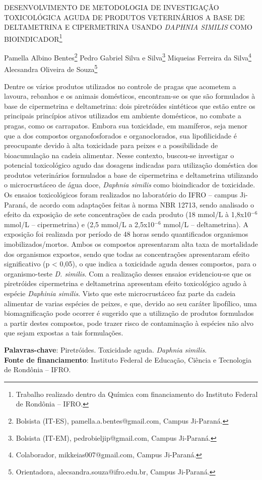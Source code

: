 \documentclass[article,12pt,onesidea,4paper,english,brazil]{abntex2}
\begin{document}
	
	
	\frenchspacing 
	
	\begin{center}
		\LARGE DESENVOLVIMENTO DE METODOLOGIA DE INVESTIGAÇÃO TOXICOLÓGICA AGUDA DE PRODUTOS VETERINÁRIOS A BASE DE DELTAMETRINA E CIPERMETRINA USANDO \textit{DAPHNIA SIMILIS} COMO BIOINDICADOR\footnote{Trabalho realizado dentro da Química com financiamento do Instituto Federal de Rondônia – IFRO.}
		
		\normalsize
	Pamella Albino Bentes\footnote{Bolsista (IT-ES), pamella.a.bentes@gmail.com, Campus Ji-Paraná.} 
		Pedro Gabriel Silva e Silva\footnote{Bolsista (IT-EM), pedrobieljip@gmail.com, Campus Ji-Paraná.} 
	Miqueias Ferreira da Silva\footnote{Colaborador, mikkeias007@gmail.com, Campus Ji-Paraná.} 
	Alecsandra Oliveira de Souza\footnote{Orientadora, alecsandra.souza@ifro.edu.br, Campus Ji-Paraná.} 
	\end{center}
	
	\noindent Dentre os vários produtos utilizados no controle de pragas que acometem a lavoura, rebanhos e os animais domésticos, encontram-se os que são formulados à base de cipermetrina e deltametrina: dois piretróides sintéticos que estão entre os principais princípios ativos utilizados em ambiente domésticos, no combate a pragas, como os carrapatos. Embora sua toxicidade, em mamíferos, seja menor que a dos compostos organofosforados e organoclorados, sua lipofilicidade é preocupante devido à alta toxicidade para peixes e a possibilidade de bioacumulação na cadeia alimentar. Nesse contexto, buscou-se investigar o potencial toxicológico agudo das dosagens indicadas para utilização doméstica dos produtos veterinários formulados a base de cipermetrina e deltametrina utilizando o microcrustáceo de água doce, \textit{Daphnia similis} como bioindicador de toxicidade. Os ensaios toxicológicos foram realizados no laboratório do IFRO – campus Ji-Paraná, de acordo com adaptações feitas à norma NBR 12713, sendo analisado o efeito da exposição de sete concentrações de cada produto (18 mmol/L à 1,8x10$^{-6}$ mmol/L – cipermetrina) e (2,5 mmol/L a 2,5x10$^{-6}$ mmol/L – deltametrina). A exposição foi realizada por período de 48 horas sendo quantificados organismos imobilizados/mortos. Ambos os compostos apresentaram alta taxa de mortalidade dos organismos expostos, sendo que todas as concentrações apresentaram efeito significativo (p < 0,05), o que indica a toxicidade aguda desses compostos, para o organismo-teste \textit{D. similis}. Com a realização desses ensaios evidenciou-se que os piretróides cipermetrina e deltametrina apresentam efeito toxicológico agudo à espécie \textit{Daphinia similis}. Visto que este microcrustáceo faz parte da cadeia alimentar de varias espécies de peixes, e que, devido ao seu caráter lipofílico, uma biomagnificação pode ocorrer é sugerido que a utilização de produtos formulados a partir destes compostos, pode trazer risco de contaminação à espécies não alvo que sejam expostas a tais formulações.
	
	\vspace{\onelineskip}
	
	\noindent
	\textbf{Palavras-chave}: Piretróides. Toxicidade aguda. \textit{Daphnia similis}. \\
	\textbf{Fonte de financiamento}: Instituto Federal de Educação, Ciência e Tecnologia de Rondônia – IFRO. 
	
\end{document}
